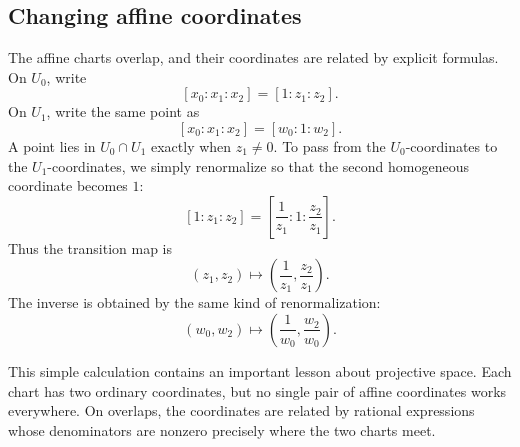 \subsection{Changing affine coordinates}

The affine charts overlap, and their coordinates are related by
explicit formulas. On \(U_0\), write
\[
[x_0:x_1:x_2]=[1:z_1:z_2].
\]
On \(U_1\), write the same point as
\[
[x_0:x_1:x_2]=[w_0:1:w_2].
\]
A point lies in \(U_0\cap U_1\) exactly when \(z_1\neq0\). To pass
from the \(U_0\)-coordinates to the \(U_1\)-coordinates, we simply
renormalize so that the second homogeneous coordinate becomes \(1\):
\[
[1:z_1:z_2]
=
\left[\frac1{z_1}:1:\frac{z_2}{z_1}\right].
\]
Thus the transition map is
\[
(z_1,z_2)
\longmapsto
\left(
\frac1{z_1},
\frac{z_2}{z_1}
\right).
\]
The inverse is obtained by the same kind of renormalization:
\[
(w_0,w_2)
\longmapsto
\left(
\frac1{w_0},
\frac{w_2}{w_0}
\right).
\]

This simple calculation contains an important lesson about projective
space. Each chart has two ordinary
coordinates, but no single pair of affine coordinates works
everywhere. On overlaps, the coordinates are related by rational
expressions whose denominators are nonzero precisely where the two
charts meet.

